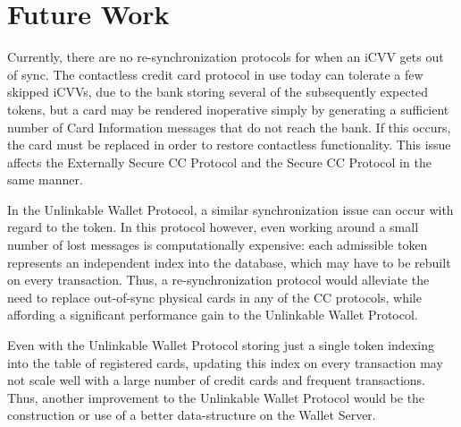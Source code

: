 \section{Future Work}

Currently, there are no re-synchronization protocols for when an iCVV gets out of sync.
The contactless credit card protocol in use today can tolerate a few skipped iCVVs, due to the bank storing several of the subsequently expected tokens,
    but a card may be rendered inoperative simply by generating a sufficient number of Card Information messages that do not reach the bank.
If this occurs, the card must be replaced in order to restore contactless functionality.
This issue affects the Externally Secure CC Protocol and the Secure CC Protocol in the same manner.

In the Unlinkable Wallet Protocol, a similar synchronization issue can occur with regard to the token.
In this protocol however, even working around a small number of lost messages is computationally expensive:
    each admissible token represents an independent index into the database, which may have to be rebuilt on every transaction.
Thus, a re-synchronization protocol would alleviate the need to replace out-of-sync physical cards in any of the CC protocols,
    while affording a significant performance gain to the Unlinkable Wallet Protocol.

Even with the Unlinkable Wallet Protocol storing just a single token indexing into the table of registered cards,
    updating this index on every transaction may not scale well with a large number of credit cards and frequent transactions.
Thus, another improvement to the Unlinkable Wallet Protocol would be the construction or use of a better data-structure on the Wallet Server.
